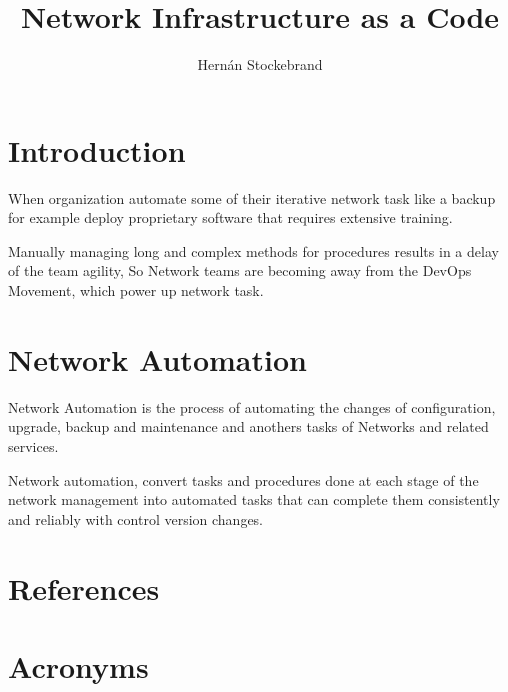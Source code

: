 \documentclass[PMO,lsstdraft,authoryear,toc]{lsstdoc}
\title{Network Infrastructure as a Code}
\author{%
Hernán Stockebrand
}
\date{\vcsDate}
\begin{document}
\maketitle

\section{Introduction}

When organization automate some of their iterative network task like a backup for example deploy proprietary software that requires extensive training.

Manually managing long and complex methods for procedures results in a delay of the team agility, So Network teams are becoming away from the DevOps Movement, which power up network task.

\section{Network Automation}

Network Automation is the process of automating the changes of configuration, upgrade, backup and maintenance and anothers tasks of Networks and related services. 

Network automation, convert tasks and procedures done at each stage of the network management into automated tasks that can complete them consistently and reliably with control version changes.





\appendix
\section{References} \label{sec:bib}
\renewcommand{\refname}{} %


\section{Acronyms} \label{sec:acronyms}

\end{document}

